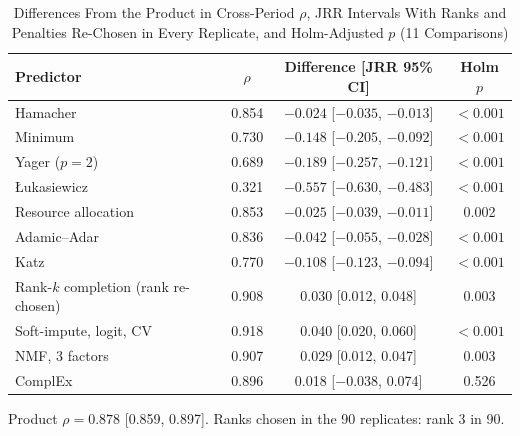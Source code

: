 \documentclass[journal]{IEEEtran}
\begin{document}
\setcounter{table}{14}\begin{table}[!t]
\caption{Differences From the Product in Cross-Period $\rho$, JRR Intervals With Ranks and Penalties Re-Chosen in Every Replicate, and Holm-Adjusted $p$ (11 Comparisons)}
\centering
\scriptsize
\setlength{\tabcolsep}{2.5pt}
\begin{tabular}{@{}l c c c@{}}
\toprule
Predictor & $\rho$ & Difference [JRR 95\% CI] & Holm $p$\\
\midrule
Hamacher & 0.854 & $-0.024$ [$-0.035$, $-0.013$] & $<0.001$\\
Minimum & 0.730 & $-0.148$ [$-0.205$, $-0.092$] & $<0.001$\\
Yager ($p=2$) & 0.689 & $-0.189$ [$-0.257$, $-0.121$] & $<0.001$\\
{\L}ukasiewicz & 0.321 & $-0.557$ [$-0.630$, $-0.483$] & $<0.001$\\
Resource allocation & 0.853 & $-0.025$ [$-0.039$, $-0.011$] & 0.002\\
Adamic--Adar & 0.836 & $-0.042$ [$-0.055$, $-0.028$] & $<0.001$\\
Katz & 0.770 & $-0.108$ [$-0.123$, $-0.094$] & $<0.001$\\
Rank-$k$ completion (rank re-chosen) & 0.908 & 0.030 [0.012, 0.048] & 0.003\\
Soft-impute, logit, CV & 0.918 & 0.040 [0.020, 0.060] & $<0.001$\\
NMF, 3 factors & 0.907 & 0.029 [0.012, 0.047] & 0.003\\
ComplEx & 0.896 & 0.018 [$-0.038$, 0.074] & 0.526\\
\bottomrule
\end{tabular}

\smallskip
\parbox{\columnwidth}{\scriptsize Product $\rho=0.878$ [0.859, 0.897]. Ranks chosen in the 90 replicates: rank 3 in 90.}
\end{table}
\end{document}

